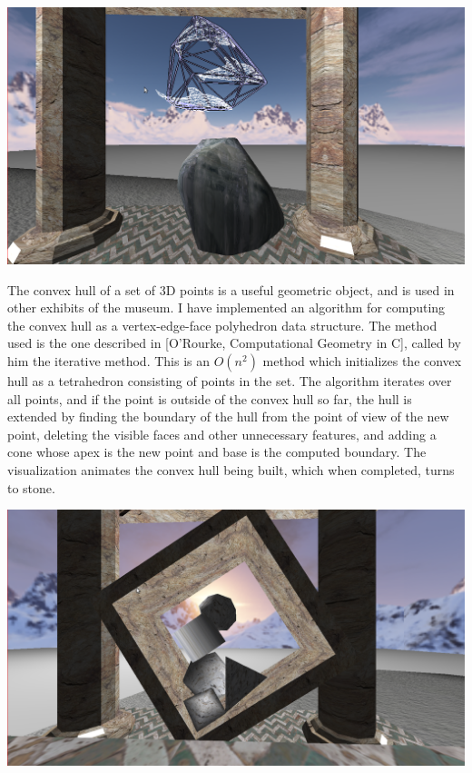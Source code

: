 \documentclass{article}
\begin{document}
\begin{center}\includegraphics[width=\linewidth]{screenshots/convex_hulls.png}\end{center}
The convex hull of a set of 3D points is a useful geometric object, and is used in other exhibits of the museum. I have implemented an algorithm
for computing the convex hull as a vertex-edge-face polyhedron data structure. The method used is the one described in [O'Rourke, Computational Geometry in C],
called by him the iterative method. This is an $O(n^2)$ method which initializes the convex hull as a tetrahedron consisting of points in the set.
The algorithm iterates over all points, and if the point is outside of the convex hull so far, the hull is extended by finding the boundary of the hull from
the point of view of the new point, deleting the visible faces and other unnecessary features, and adding a cone whose apex is the new point and base is the computed boundary.
The visualization animates the convex hull being built, which when completed, turns to stone.

\begin{center}\includegraphics[width=\linewidth]{screenshots/rigid_bodies.png}\end{center}
\end{document}
